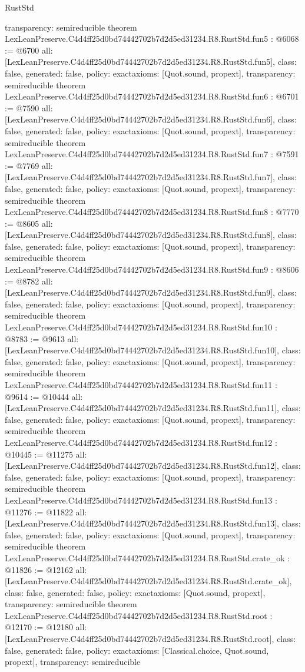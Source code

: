 \begin{lexlean}{RustStd}
\begin{coremodule}
{  transparency: semireducible
}
theorem LexLeanPreserve.C4d4ff25d0bd74442702b7d2d5ed31234.R8.RustStd.fun5 : @6068 := @6700 {
  all: [LexLeanPreserve.C4d4ff25d0bd74442702b7d2d5ed31234.R8.RustStd.fun5],
  class: false,
  generated: false,
  policy: exact{axioms: [Quot.sound, propext]},
  transparency: semireducible
}
theorem LexLeanPreserve.C4d4ff25d0bd74442702b7d2d5ed31234.R8.RustStd.fun6 : @6701 := @7590 {
  all: [LexLeanPreserve.C4d4ff25d0bd74442702b7d2d5ed31234.R8.RustStd.fun6],
  class: false,
  generated: false,
  policy: exact{axioms: [Quot.sound, propext]},
  transparency: semireducible
}
theorem LexLeanPreserve.C4d4ff25d0bd74442702b7d2d5ed31234.R8.RustStd.fun7 : @7591 := @7769 {
  all: [LexLeanPreserve.C4d4ff25d0bd74442702b7d2d5ed31234.R8.RustStd.fun7],
  class: false,
  generated: false,
  policy: exact{axioms: [Quot.sound, propext]},
  transparency: semireducible
}
theorem LexLeanPreserve.C4d4ff25d0bd74442702b7d2d5ed31234.R8.RustStd.fun8 : @7770 := @8605 {
  all: [LexLeanPreserve.C4d4ff25d0bd74442702b7d2d5ed31234.R8.RustStd.fun8],
  class: false,
  generated: false,
  policy: exact{axioms: [Quot.sound, propext]},
  transparency: semireducible
}
theorem LexLeanPreserve.C4d4ff25d0bd74442702b7d2d5ed31234.R8.RustStd.fun9 : @8606 := @8782 {
  all: [LexLeanPreserve.C4d4ff25d0bd74442702b7d2d5ed31234.R8.RustStd.fun9],
  class: false,
  generated: false,
  policy: exact{axioms: [Quot.sound, propext]},
  transparency: semireducible
}
theorem LexLeanPreserve.C4d4ff25d0bd74442702b7d2d5ed31234.R8.RustStd.fun10 : @8783 := @9613 {
  all: [LexLeanPreserve.C4d4ff25d0bd74442702b7d2d5ed31234.R8.RustStd.fun10],
  class: false,
  generated: false,
  policy: exact{axioms: [Quot.sound, propext]},
  transparency: semireducible
}
theorem LexLeanPreserve.C4d4ff25d0bd74442702b7d2d5ed31234.R8.RustStd.fun11 : @9614 := @10444 {
  all: [LexLeanPreserve.C4d4ff25d0bd74442702b7d2d5ed31234.R8.RustStd.fun11],
  class: false,
  generated: false,
  policy: exact{axioms: [Quot.sound, propext]},
  transparency: semireducible
}
theorem LexLeanPreserve.C4d4ff25d0bd74442702b7d2d5ed31234.R8.RustStd.fun12 : @10445 := @11275 {
  all: [LexLeanPreserve.C4d4ff25d0bd74442702b7d2d5ed31234.R8.RustStd.fun12],
  class: false,
  generated: false,
  policy: exact{axioms: [Quot.sound, propext]},
  transparency: semireducible
}
theorem LexLeanPreserve.C4d4ff25d0bd74442702b7d2d5ed31234.R8.RustStd.fun13 : @11276 := @11822 {
  all: [LexLeanPreserve.C4d4ff25d0bd74442702b7d2d5ed31234.R8.RustStd.fun13],
  class: false,
  generated: false,
  policy: exact{axioms: [Quot.sound, propext]},
  transparency: semireducible
}
theorem LexLeanPreserve.C4d4ff25d0bd74442702b7d2d5ed31234.R8.RustStd.crate_ok : @11826 := @12162 {
  all: [LexLeanPreserve.C4d4ff25d0bd74442702b7d2d5ed31234.R8.RustStd.crate_ok],
  class: false,
  generated: false,
  policy: exact{axioms: [Quot.sound, propext]},
  transparency: semireducible
}
theorem LexLeanPreserve.C4d4ff25d0bd74442702b7d2d5ed31234.R8.RustStd.root : @12170 := @12180 {
  all: [LexLeanPreserve.C4d4ff25d0bd74442702b7d2d5ed31234.R8.RustStd.root],
  class: false,
  generated: false,
  policy: exact{axioms: [Classical.choice, Quot.sound, propext]},
  transparency: semireducible
}


\end{coremodule}
\end{lexlean}
